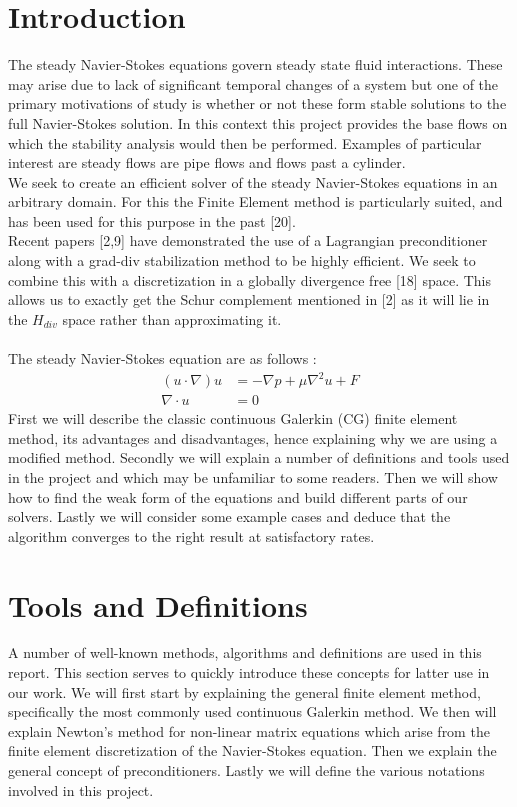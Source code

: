 \documentclass[11pt,twoside,a4paper]{article}
\begin{document}
\section{Introduction}
The steady Navier-Stokes equations govern steady state fluid interactions. These may arise due to lack of significant temporal changes of a system but one of the primary motivations of study is whether or not these form stable solutions to the full Navier-Stokes solution. In this context this project provides the base flows on which the stability analysis would then be performed. Examples of particular interest are steady flows are pipe flows and flows past a cylinder.\\
We seek to create an efficient solver of the steady Navier-Stokes equations in an arbitrary domain. For this the Finite Element method is particularly suited, and has been used for this purpose in the past [20]. \\
Recent papers [2,9] have demonstrated the use of a Lagrangian preconditioner along with a grad-div stabilization method to be highly efficient. We seek to combine this with a discretization in a globally divergence free [18] space. This allows us to exactly get the Schur complement mentioned in [2] as it will lie in the $H_{div}$ space rather than approximating it.\\
\\
The steady Navier-Stokes equation are as follows :
\begin{align}
(u \cdot \nabla) u &= -\nabla p + \mu \nabla^2 u + F \\
\nabla \cdot u &= 0
\end{align}
First we will describe the classic continuous Galerkin (CG) finite element method, its advantages and disadvantages, hence explaining why we are using a modified method. Secondly we will explain a number of definitions and tools used in the project and which may be unfamiliar to some readers. Then we will show how to find the weak form of the equations and build different parts of our solvers. Lastly we will consider some example cases and deduce that the algorithm converges to the right result at satisfactory rates.\\

\section{Tools and Definitions}
A number of well-known methods, algorithms and definitions are used in this report. This section serves to quickly introduce these concepts for latter use in our work. We will first start by explaining the general finite element method, specifically the most commonly used continuous Galerkin method. We then will explain Newton's method for non-linear matrix equations which arise from the finite element discretization of the Navier-Stokes equation. Then we explain the general concept of preconditioners. Lastly we will define the various notations involved in this project.
\end{document}
